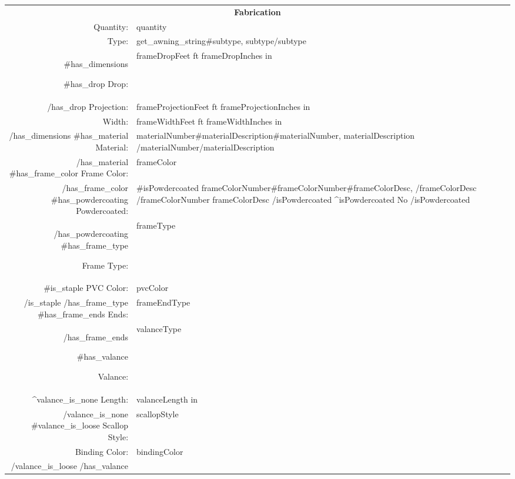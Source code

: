 \documentclass[11pt]{article}
\begin{document}
\setlength{\columnseprule}{0pt}
\begin{multicols}{2}
  \begin{tabularx}{0.95\linewidth}{rX}
  \multicolumn{2}{c}{\textbf{Fabrication}} \\
    Quantity: & {{quantity}} \\
    Type: & {{get_awning_string}}{{#subtype}}, {{subtype}}{{/subtype}}\\
    {{#has_dimensions}}
        \cline{1-1}
        {{#has_drop}}
          Drop: & {{frameDropFeet}} ft {{frameDropInches}} in \\
        {{/has_drop}}
        Projection: & {{frameProjectionFeet}} ft {{frameProjectionInches}} in \\
        Width: & {{frameWidthFeet}} ft {{frameWidthInches}} in \\
        \cline{1-1}
    {{/has_dimensions}}
    {{#has_material}}
      Material: & {{materialNumber}}{{#materialDescription}}{{#materialNumber}},
      {{materialDescription}}
      {{/materialNumber}}{{/materialDescription}} \\
    {{/has_material}}
    {{#has_frame_color}}
      Frame Color: & {{frameColor}} \\
    {{/has_frame_color}}
    {{#has_powdercoating}}
        Powdercoated: &
          {{#isPowdercoated}}
            {{frameColorNumber}}{{#frameColorNumber}}{{#frameColorDesc}},
              {{/frameColorDesc}} {{/frameColorNumber}}
            {{frameColorDesc}}
          {{/isPowdercoated}}
          {{^isPowdercoated}} No {{/isPowdercoated}} \\
    {{/has_powdercoating}}
    {{#has_frame_type}}
      \cline{1-1}
      Frame Type: & {{frameType}} \\
      {{#is_staple}}
        PVC Color: & {{pvcColor}} \\
      {{/is_staple}}
    {{/has_frame_type}}
    {{#has_frame_ends}}
      Ends: & {{frameEndType}} \\
    {{/has_frame_ends}}

    {{#has_valance}}
      \cline{1-1}
      Valance: & {{valanceType}} \\
      {{^valance_is_none}}
        Length: & {{valanceLength}} in \\
      {{/valance_is_none}}
      {{#valance_is_loose}}
        Scallop Style: & {{scallopStyle}} \\
        Binding Color: & {{bindingColor}} \\
      {{/valance_is_loose}}
    {{/has_valance}}


\end{tabularx}
\end{multicols}
\end{document}
